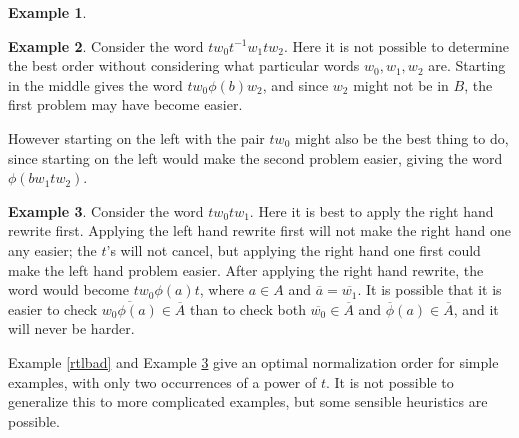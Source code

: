 \documentclass[12pt]{article} %
\theoremstyle{definition}
\theoremstyle{definition}
\theoremstyle{definition}
\theoremstyle{definition}
\theoremstyle{definition}
\theoremstyle{definition}
\newtheorem{exmpl}{Example}[theorem]
\begin{document}
\begin{exmpl}

\end{exmpl}

\begin{exmpl}
  Consider the word $tw_0t^{-1}w_1tw_2$. Here it is not possible to determine the best order without
  considering what particular words $w_0, w_1, w_2$ are. Starting in the middle gives the word
  $tw_0\phi(b)w_2$, and since $w_2$ might not be in $B$, the first problem may have become easier.

  However starting on the left with the pair $tw_0$
  might also be the best thing to do, since starting on the left would
  make the second problem easier, giving the word $\phi(bw_1 t w_2)$.
\end{exmpl}

\begin{exmpl}\label{ltrbad2}
  Consider the word $tw_0tw_1$. Here it is best to apply the right hand rewrite first.
  Applying the left hand rewrite first will not make the right hand one any easier; the $t$'s will
  not cancel, but applying the right hand one first could make the left hand problem easier.
  After applying the right hand rewrite, the word would become $tw_0\phi(a)t$, where $a \in A$
  and $\overline{a} = \overline{w_1}$. It is possible that it is easier to check
  $\overline{w_0\phi(a)} \in \overline{A}$
  than to check both $\overline{w_0} \in \overline{A}$ and $\overline{\phi}(a) \in \overline{A}$,
  and it will never be harder.
\end{exmpl}

Example \ref{rtlbad} and Example \ref{ltrbad2} give an optimal normalization order
for simple examples, with only two occurrences of a power of $t$.
It is not possible to generalize this to more complicated examples,
but some sensible heuristics are possible.
\end{document}

